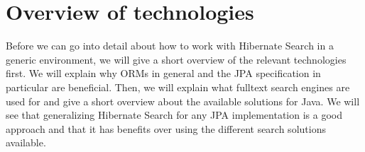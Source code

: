 
\section{Overview of technologies}\label{Overview}
Before we can go into detail about how to work with Hibernate Search in a generic environment, we will give a short overview of the relevant technologies first. We will explain why ORMs in general and the JPA specification in particular are beneficial. Then, we will explain what fulltext search engines are used for and give a short overview about the available solutions for Java. We will see that generalizing Hibernate Search for any JPA implementation is a good approach and that it has benefits over using the different search solutions available.

